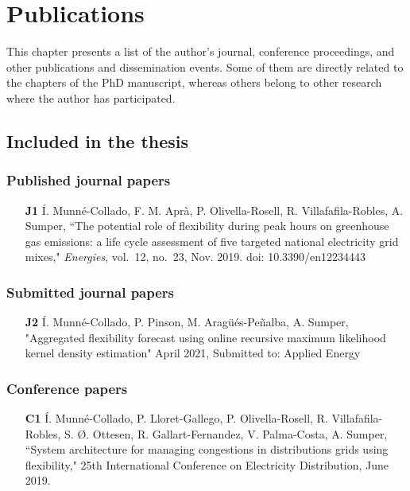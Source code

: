 \chapter{Publications}
This chapter presents a list of the author's journal, conference proceedings, and other publications and dissemination events. Some of them are directly related to the chapters of the PhD manuscript, whereas others belong to other research where the author has participated. 

\section*{Included in the thesis}
\subsection*{Published journal papers}

\begin{itemize}
	
	\item[\textbf{J1}] \'{I}. Munn\'{e}-Collado, F. M. Apr\`{a}, P. Olivella-Rosell, R. Villafafila-Robles, A. Sumper, ``The potential role of flexibility during peak hours on greenhouse gas emissions: a life cycle assessment of five targeted national electricity grid mixes," \textit{Energies}, vol.~12, no.~23, Nov. 2019. doi: 10.3390/en12234443
	
\end{itemize}

\subsection*{Submitted journal papers}
\begin{itemize}
	\item [\textbf{J2}] \'{I}. Munn\'{e}-Collado, P. Pinson, M. Arag\"{u}\'{e}s-Pe\~{n}alba, A. Sumper, "Aggregated flexibility forecast using online recursive maximum likelihood kernel density estimation" April 2021, Submitted to: Applied Energy
\end{itemize}

\subsection*{Conference papers}

\begin{itemize}
	\item[\textbf{C1}] \'{I}. Munn\'{e}-Collado, P. Lloret-Gallego, P. Olivella-Rosell, R. Villafafila-Robles, S. \O{}. Ottesen, R. Gallart-Fernandez, V. Palma-Costa, A. Sumper, ``System architecture for managing congestions in distributions grids using flexibility," 25th International Conference on Electricity Distribution, June 2019.
\end{itemize}

